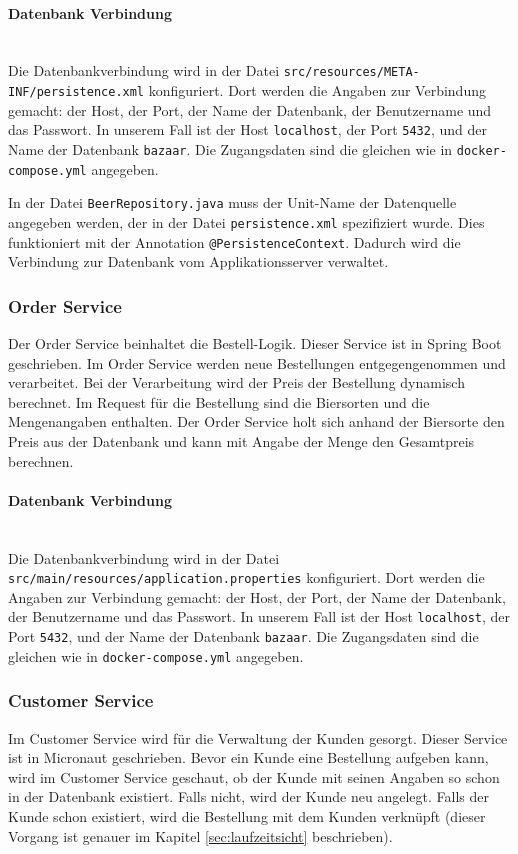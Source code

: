 \paragraph{Datenbank Verbindung} \mbox{} \\ 
Die Datenbankverbindung wird in der Datei \texttt{src/resources/META-INF/persistence.xml} konfiguriert.
Dort werden die Angaben zur Verbindung gemacht: der Host, der Port, der Name der Datenbank, der Benutzername
und das Passwort.
In unserem Fall ist der Host \texttt{localhost}, der Port \texttt{5432}, und der Name der Datenbank
\texttt{bazaar}.
Die Zugangsdaten sind die gleichen wie in \texttt{docker-compose.yml} angegeben.

In der Datei \texttt{BeerRepository.java} muss der Unit-Name der Datenquelle angegeben werden,
der in der Datei \texttt{persistence.xml} spezifiziert wurde. Dies funktioniert mit der Annotation \texttt{@PersistenceContext}.
Dadurch wird die Verbindung zur Datenbank vom Applikationsserver verwaltet.


\subsubsection{Order Service}
\label{subsubsec:OrderService}
Der Order Service beinhaltet die Bestell-Logik. Dieser Service ist in Spring Boot geschrieben. Im Order Service werden neue Bestellungen entgegengenommen und verarbeitet. Bei der Verarbeitung wird der Preis der Bestellung dynamisch berechnet. Im Request für die Bestellung sind die Biersorten und die Mengenangaben enthalten. Der Order Service holt sich anhand der Biersorte den Preis aus der Datenbank und kann mit Angabe der Menge den Gesamtpreis berechnen.

\paragraph{Datenbank Verbindung} \mbox{} \\ 
Die Datenbankverbindung wird in der Datei \texttt{src/main/resources/application.properties} konfiguriert. Dort werden die Angaben zur Verbindung gemacht: der Host, der Port, der Name der Datenbank, der Benutzername und das Passwort. In unserem Fall ist der Host \texttt{localhost}, der Port \texttt{5432}, und der Name der Datenbank \texttt{bazaar}. Die Zugangsdaten sind die gleichen wie in \texttt{docker-compose.yml} angegeben.


\subsubsection{Customer Service}
\label{subsubsec:CustomerService}
Im Customer Service wird für die Verwaltung der Kunden gesorgt. Dieser Service ist in Micronaut geschrieben. Bevor ein Kunde eine Bestellung aufgeben kann, wird im Customer Service geschaut, ob der Kunde mit seinen Angaben so schon in der Datenbank existiert. Falls nicht, wird der Kunde neu angelegt. Falls der Kunde schon existiert, wird die Bestellung mit dem Kunden verknüpft (dieser Vorgang ist genauer im Kapitel \ref{sec:laufzeitsicht} beschrieben).

